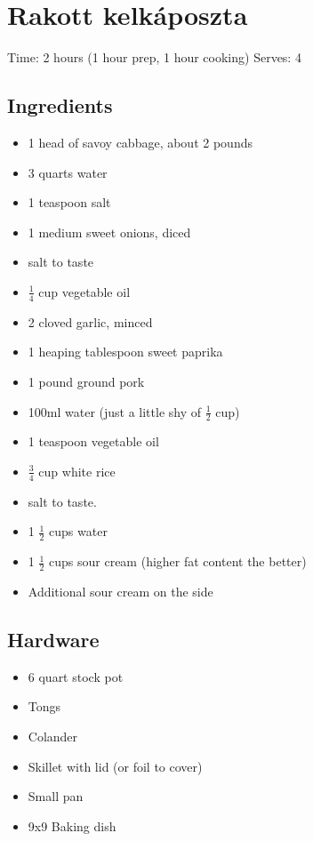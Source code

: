 \section{Rakott kelkáposzta}
\label{rakottKelkaposzta}
\setcounter{secnumdepth}{0}
Time: 2 hours (1 hour prep, 1 hour cooking)
Serves: 4

\begin{multicols}{2}
\subsection*{Ingredients}
\begin{itemize}
    \item 1 head of savoy cabbage, about 2 pounds
    \item 3 quarts water
    \item 1 teaspoon salt
    \item 1 medium sweet onions, diced
    \item salt to taste
    \item \( \frac{1}{4} \) cup vegetable oil
    \item 2 cloved garlic, minced
    \item 1 heaping tablespoon sweet paprika
    \item 1 pound ground pork
    \item 100ml water (just a little shy of \( \frac{1}{2} \) cup)
    \item 1 teaspoon vegetable oil
    \item \( \frac{3}{4} \) cup white rice
    \item salt to taste.
    \item 1 \( \frac{1}{2} \) cups water
    \item 1 \( \frac{1}{2} \) cups sour cream (higher fat content the better)
    \item Additional sour cream on the side
\end{itemize}

\subsection*{Hardware}
\begin{itemize}
    \item 6 quart stock pot
    \item Tongs
    \item Colander
    \item Skillet with lid (or foil to cover)
    \item Small pan
    \item 9x9 Baking dish
\end{itemize}
\clearpage


\end{multicols}
